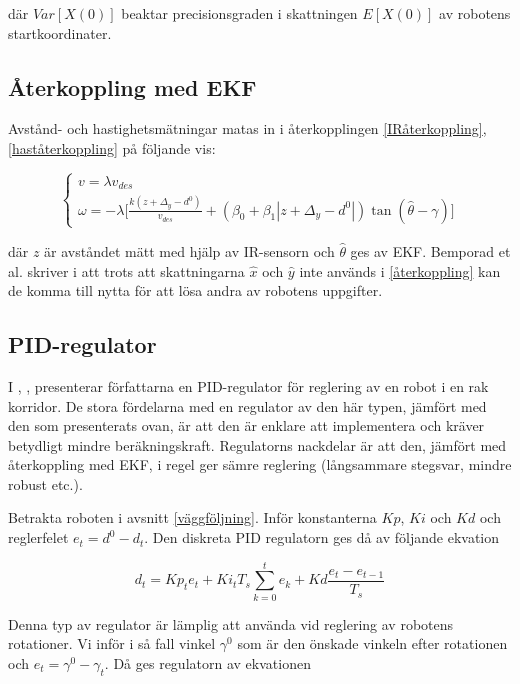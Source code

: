 \documentclass[11pt]{article}
\begin{document}
\begin{flushleft}
där $Var[X(0)]$ beaktar precisionsgraden i skattningen $E[X(0)]$ av robotens startkoordinater.

\subsection{Återkoppling med EKF}
Avstånd- och hastighetsmätningar matas in i återkopplingen \eqref{IRåterkoppling},  \eqref{haståterkoppling} på följande vis:

\begin{equation}\label{återkoppling}
	\begin{cases}
	v = \lambda v_{des} \\
	\omega = - \lambda \bigg[ \frac {k(z + \Delta_y - d^0)} {v_{des}} + (\beta_0 + \beta_1 | z + \Delta_y - d^0 |) \tan (\hat{\theta} - \gamma) \bigg]
	\end{cases}
\end{equation}

där $z$ är avståndet mätt med hjälp av IR-sensorn och $\hat{\theta}$ ges av EKF. Bemporad et al. skriver i \cite{wfp} att trots att skattningarna $\hat{x}$ och $\hat{y}$ inte används i \eqref{återkoppling} kan de komma till nytta för att lösa andra av robotens uppgifter.

\subsection{PID-regulator}
I \cite{PID1}, \cite{PID2}, \cite{PID3} presenterar författarna en PID-regulator för reglering av en robot i en rak korridor. De stora fördelarna med en regulator av den här typen, jämfört med den som presenterats ovan, är att den är enklare att implementera och kräver betydligt mindre beräkningskraft. Regulatorns nackdelar är att den, jämfört med återkoppling med EKF, i regel ger sämre reglering (långsammare stegsvar, mindre robust etc.).

Betrakta roboten i avsnitt \ref{väggföljning}. Inför konstanterna $Kp$, $Ki$ och $Kd$ och reglerfelet $e_t = d^0 - d_t$. Den diskreta PID regulatorn ges då av följande ekvation

\begin{equation}
	d_t = Kp_t e_t + Ki_t T_s \displaystyle\sum_{k=0}^{t} e_k + Kd \frac {e_t - e_{t-1}}{T_s}
\end{equation}

Denna typ av regulator är lämplig att använda vid reglering av robotens rotationer. Vi inför i så fall vinkel $\gamma^0$ som är den önskade vinkeln efter rotationen och $e_t = \gamma^0 - \gamma_t$. Då ges regulatorn av ekvationen 


\end{flushleft}
\end{document}
